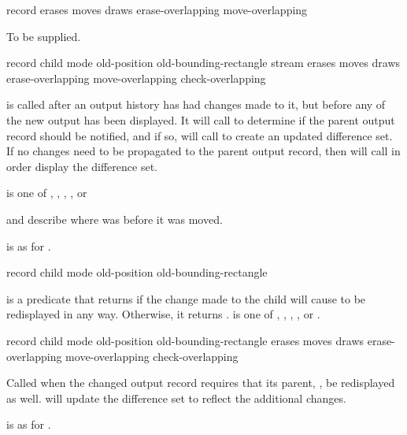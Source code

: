  {record erases moves draws erase-overlapping move-overlapping}

 {To be supplied.}


            {record child mode old-position old-bounding-rectangle stream
             \optional erases moves draws erase-overlapping move-overlapping
             \key check-overlapping}

 is called after an output history has had
changes made to it, but before any of the new output has been displayed.  It
will call  to determine if the parent
output record should be notified, and if so, will call
 to create an updated difference set.  If no
changes need to be propagated to the parent output record, then
 will call  in
order display the difference set.

 is one of , , , , or

 and  describe where 
was before it was moved.

 is as for .


 {record child mode 
                                                 old-position old-bounding-rectangle}

 is a predicate that returns 
if the change made to the child will cause  to be redisplayed in any
way.  Otherwise, it returns .   is one of ,
, , , or .

            {record child mode 
             \optional old-position old-bounding-rectangle
                       erases moves draws erase-overlapping move-overlapping check-overlapping}

Called when the changed  output record requires that its parent,
, be redisplayed as well.  
will update the difference set to reflect the additional changes.

 is as for .



